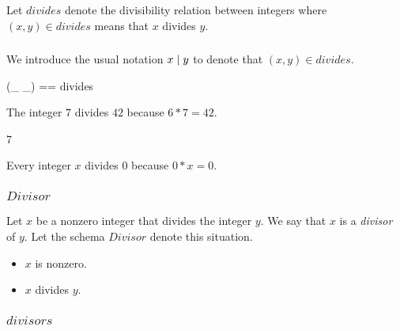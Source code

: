\documentclass[11pt, oneside]{article}
\begin{document}
Let $divides$ denote the divisibility relation between integers
where $(x,y) \in divides$ means that $x$ divides $y$.


\subsubsection{}

We introduce the usual notation $x \mathrel{\mid} y$ to denote that $(x, y) \in divides$.
\begin{zed}
(\_ \divides \_) == divides
\end{zed}

\begin{example}
The integer $7$ divides $42$ because $6 * 7 = 42$.

\begin{zed}
	7 
\end{zed}
\end{example}

\begin{remark}
Every integer $x$ divides $0$ because $0 * x = 0$.

\end{remark}

\subsubsection{$Divisor$}

Let $x$ be a nonzero integer that divides the integer $y$.
We say that $x$ is a \textit{divisor} of $y$.
Let the schema $Divisor$ denote this situation.

\begin{itemize}
	\item $x$ is nonzero.
	\item $x$ divides $y$.
\end{itemize}

\subsubsection{$divisors$}
\end{document}
